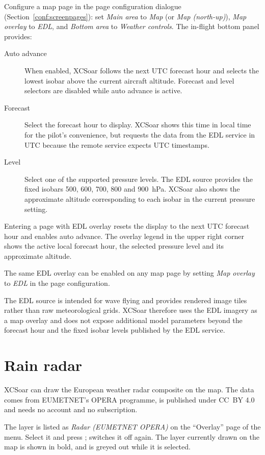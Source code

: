 Configure a map page in the page configuration dialogue
(Section~\ref{conf:screenpages}): set \emph{Main area} to \emph{Map}
(or \emph{Map (north-up)}), \emph{Map overlay} to \emph{EDL}, and
\emph{Bottom area} to \emph{Weather controls}.  The in-flight bottom
panel provides:
\begin{description}
\item[Auto advance] When enabled, XCSoar follows the next UTC forecast
  hour and selects the lowest isobar above the current aircraft
  altitude.  Forecast and level selectors are disabled while auto advance
  is active.
\item[Forecast] Select the forecast hour to display.  XCSoar shows this
  time in local time for the pilot's convenience, but requests the data
  from the EDL service in UTC because the remote service expects UTC
  timestamps.
\item[Level] Select one of the supported pressure levels.  The EDL
  source provides the fixed isobars 500, 600, 700, 800 and 900~hPa.
  XCSoar also shows the approximate altitude corresponding to each
  isobar in the current pressure setting.
\end{description}

Entering a page with EDL overlay resets the display to the next UTC
forecast hour and enables auto advance.  The overlay legend in the upper
right corner shows the active local forecast hour, the selected pressure
level and its approximate altitude.

The same EDL overlay can be enabled on any map page by setting
\emph{Map overlay} to \emph{EDL} in the page configuration.

The EDL source is intended for wave flying and provides rendered image
tiles rather than raw meteorological grids.  XCSoar therefore uses the
EDL imagery as a map overlay and does not expose additional model
parameters beyond the forecast hour and the fixed isobar levels
published by the EDL service.

\section{Rain radar}\label{sec:rain-radar}

XCSoar can draw the European weather radar composite on the map.  The
data comes from EUMETNET's OPERA programme, is published under CC~BY
4.0 and needs no account and no subscription.

The layer is listed as \emph{Radar (EUMETNET OPERA)} on the
``Overlay'' page of the
  menu.
Select it and press ;  switches it off
again.  The layer currently drawn on the map is shown in bold, and
 is greyed out while it is selected.

